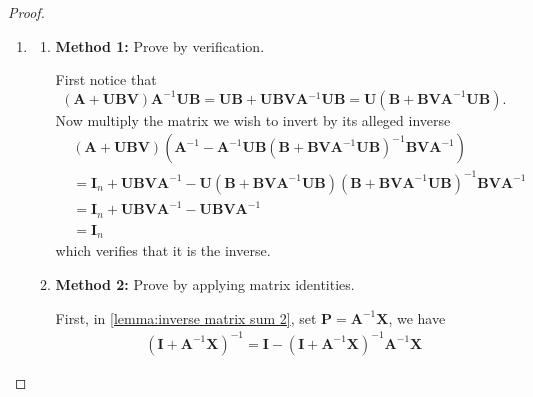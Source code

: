 \documentclass[13pt]{article}
\theoremstyle{definition}
\theoremstyle{remark}
\begin{document}
\begin{proof}\hfill
    \begin{enumerate}[label=(\alph*)]
        \item \begin{enumerate}[label=(\roman*)]
            \item \textbf{Method 1:} Prove by verification.

            First notice that
            $$
            (\mathbf{A}+\mathbf{U B \mathbf{V}}) \mathbf{A}^{-1} \mathbf{U B}=\mathbf{U B}+\mathbf{U B \mathbf{V} A}{ }^{-1} \mathbf{U B}=\mathbf{U}\left(\mathbf{B}+\mathbf{B \mathbf{V} A}^{-1} \mathbf{U B}\right) .
            $$
            Now multiply the matrix we wish to invert by its alleged inverse
            \begin{align*}
            & (\mathbf{A}+\mathbf{U B \mathbf{V}})\left(\mathbf{A}^{-1}-\mathbf{A}^{-1} \mathbf{U B}\left(\mathbf{B}+\mathbf{B \mathbf{V} A}^{-1} \mathbf{U B}\right)^{-1} \mathbf{B \mathbf{V} A}^{-1}\right) \\
            & =\mathbf{\mathbf{I}}_n+\mathbf{U B \mathbf{V} A}^{-1}-\mathbf{U}\left(\mathbf{B}+\mathbf{B \mathbf{V} A}^{-1} \mathbf{U B}\right)\left(\mathbf{B}+\mathbf{B \mathbf{V} A}^{-1} \mathbf{U B}\right)^{-1} \mathbf{B \mathbf{V} A}^{-1} \\
            & =\mathbf{\mathbf{I}}_n+\mathbf{U B \mathbf{V} A}^{-1}-\mathbf{U B \mathbf{V}} \mathbf{A}^{-1}\\
            &=\mathbf{\mathbf{I}}_n 
            \end{align*}
            which verifies that it is the inverse.
            \item \textbf{Method 2:} Prove by applying matrix identities.

            First, in \cref{lemma:inverse matrix sum 2}, set $\mathbf{\mathbf{P}} =\mathbf{A}^{-1}\mathbf{\mathbf{X}}$, we have \begin{align}(\mathbf{\mathbf{I}}+\mathbf{A}^{-1}\mathbf{\mathbf{X}})^{-1}= \mathbf{\mathbf{I}}-(\mathbf{\mathbf{I}}+\mathbf{A}^{-1}\mathbf{\mathbf{X}})^{-1}\mathbf{A}^{-1}\mathbf{\mathbf{X}}\label{eq:eq 1}
            \end{align}
            

\end{enumerate}
\end{enumerate}
\end{proof}
\end{document}
